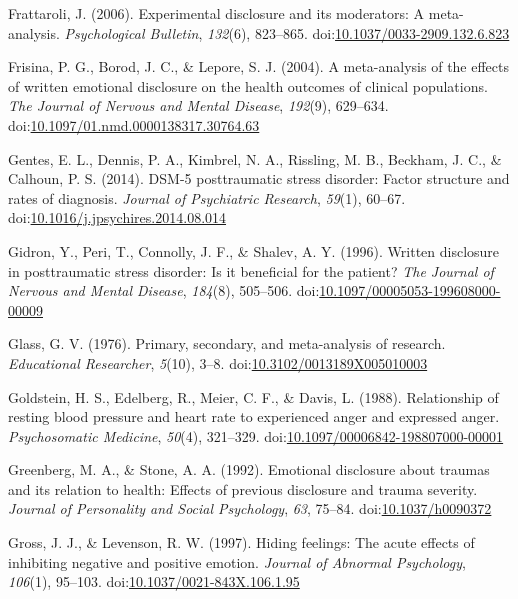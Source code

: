 \documentclass[man, mask]{apa6}
\theoremstyle{definition}
\theoremstyle{definition}
\theoremstyle{definition}
\theoremstyle{remark}
\begin{document}
\hypertarget{ref-Frattaroli2006}{}
Frattaroli, J. (2006). Experimental disclosure and its moderators: A
meta-analysis. \emph{Psychological Bulletin}, \emph{132}(6), 823--865.
doi:\href{https://doi.org/10.1037/0033-2909.132.6.823}{10.1037/0033-2909.132.6.823}

\hypertarget{ref-Frisina2004a}{}
Frisina, P. G., Borod, J. C., \& Lepore, S. J. (2004). A meta-analysis
of the effects of written emotional disclosure on the health outcomes of
clinical populations. \emph{The Journal of Nervous and Mental Disease},
\emph{192}(9), 629--634.
doi:\href{https://doi.org/10.1097/01.nmd.0000138317.30764.63}{10.1097/01.nmd.0000138317.30764.63}

\hypertarget{ref-Gentes2014}{}
Gentes, E. L., Dennis, P. A., Kimbrel, N. A., Rissling, M. B., Beckham,
J. C., \& Calhoun, P. S. (2014). DSM-5 posttraumatic stress disorder:
Factor structure and rates of diagnosis. \emph{Journal of Psychiatric
Research}, \emph{59}(1), 60--67.
doi:\href{https://doi.org/10.1016/j.jpsychires.2014.08.014}{10.1016/j.jpsychires.2014.08.014}

\hypertarget{ref-Gidron1996a}{}
Gidron, Y., Peri, T., Connolly, J. F., \& Shalev, A. Y. (1996). Written
disclosure in posttraumatic stress disorder: Is it beneficial for the
patient? \emph{The Journal of Nervous and Mental Disease},
\emph{184}(8), 505--506.
doi:\href{https://doi.org/10.1097/00005053-199608000-00009}{10.1097/00005053-199608000-00009}

\hypertarget{ref-Glass1976}{}
Glass, G. V. (1976). Primary, secondary, and meta-analysis of research.
\emph{Educational Researcher}, \emph{5}(10), 3--8.
doi:\href{https://doi.org/10.3102/0013189X005010003}{10.3102/0013189X005010003}

\hypertarget{ref-Goldstein1988}{}
Goldstein, H. S., Edelberg, R., Meier, C. F., \& Davis, L. (1988).
Relationship of resting blood pressure and heart rate to experienced
anger and expressed anger. \emph{Psychosomatic Medicine}, \emph{50}(4),
321--329.
doi:\href{https://doi.org/10.1097/00006842-198807000-00001}{10.1097/00006842-198807000-00001}

\hypertarget{ref-Greenberg1992}{}
Greenberg, M. A., \& Stone, A. A. (1992). Emotional disclosure about
traumas and its relation to health: Effects of previous disclosure and
trauma severity. \emph{Journal of Personality and Social Psychology},
\emph{63}, 75--84.
doi:\href{https://doi.org/10.1037/h0090372}{10.1037/h0090372}

\hypertarget{ref-Gross1997}{}
Gross, J. J., \& Levenson, R. W. (1997). Hiding feelings: The acute
effects of inhibiting negative and positive emotion. \emph{Journal of
Abnormal Psychology}, \emph{106}(1), 95--103.
doi:\href{https://doi.org/10.1037/0021-843X.106.1.95}{10.1037/0021-843X.106.1.95}
\end{document}

